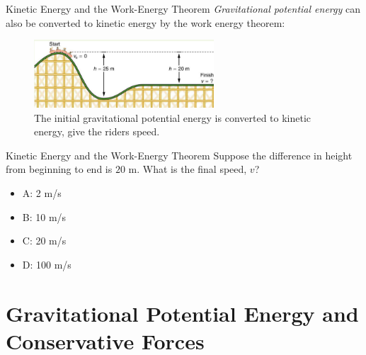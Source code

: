 \documentclass{beamer}
\begin{document}
\begin{frame}{Kinetic Energy and the Work-Energy Theorem}
\textit{Gravitational potential energy} can also be converted to kinetic energy by the work energy theorem:
\begin{figure}
\centering
\includegraphics[width=0.6\textwidth,trim=0.25cm 0cm 0cm 0.25cm,clip=true]{figures/roller.png}
\caption{\label{fig:roller} The initial gravitational potential energy is converted to kinetic energy, give the riders speed.}
\end{figure}
\end{frame}

\begin{frame}{Kinetic Energy and the Work-Energy Theorem}
Suppose the difference in height from beginning to end is $20$ m.  What is the final speed, $v$? \\ \vspace{1cm}
\begin{itemize}
\item A: 2 m/s
\item B: 10 m/s
\item C: 20 m/s
\item D: 100 m/s
\end{itemize}
\end{frame}

\section{Gravitational Potential Energy and Conservative Forces}
\end{document}
